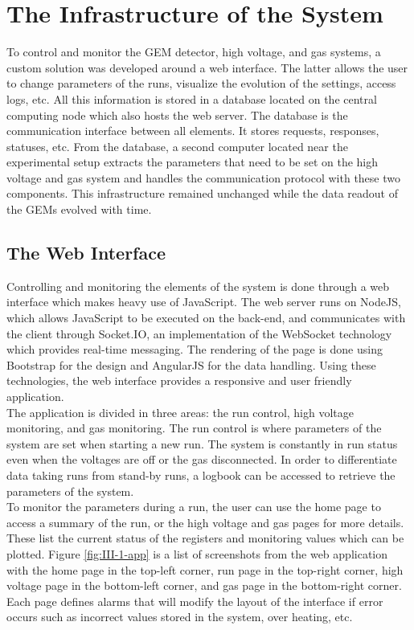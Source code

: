   \section{The Infrastructure of the System}

    To control and monitor the GEM detector, high voltage, and gas systems, a custom solution was developed around a web interface. The latter allows the user to change parameters of the runs, visualize the evolution of the settings, access logs, etc. All this information is stored in a database located on the central computing node which also hosts the web server. The database is the communication interface between all elements. It stores requests, responses, statuses, etc. From the database, a second computer located near the experimental setup extracts the parameters that need to be set on the high voltage and gas system and handles the communication protocol with these two components. This infrastructure remained unchanged while the data readout of the GEMs evolved with time.

    \subsection{The Web Interface}

      Controlling and monitoring the elements of the system is done through a web interface which makes heavy use of JavaScript. The web server runs on NodeJS, which allows JavaScript to be executed on the back-end, and communicates with the client through Socket.IO, an implementation of the WebSocket technology which provides real-time messaging. The rendering of the page is done using Bootstrap for the design and AngularJS for the data handling. Using these technologies, the web interface provides a responsive and user friendly application. \\

      The application is divided in three areas: the run control, high voltage monitoring, and gas monitoring. The run control is where parameters of the system are set when starting a new run. The system is constantly in run status even when the voltages are off or the gas disconnected. In order to differentiate data taking runs from stand-by runs, a logbook can be accessed to retrieve the parameters of the system. \\

      To monitor the parameters during a run, the user can use the home page to access a summary of the run, or the high voltage and gas pages for more details. These list the current status of the registers and monitoring values which can be plotted. Figure \ref{fig:III-1-app} is a list of screenshots from the web application with the home page in the top-left corner, run page in the top-right corner, high voltage page in the bottom-left corner, and gas page in the bottom-right corner. Each page defines alarms that will modify the layout of the interface if error occurs such as incorrect values stored in the system, over heating, etc. \\

